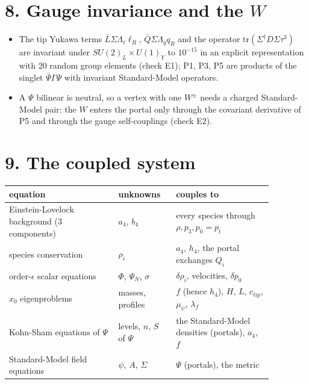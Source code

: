 \documentclass[11pt]{article}
\begin{document}
\section*{8. Gauge invariance and the $W$}

\begin{itemize}
\item The tip Yukawa terms $\bar L\Sigma\Lambda_\ell\ell_R$, $\bar Q\Sigma\Lambda_qq_R$ and the operator $\mathrm{tr}(\Sigma^\dagger D\Sigma\tau^3)$ are invariant under $SU(2)_L\times U(1)_Y$ to $10^{-15}$ in an explicit representation with 20 random group elements (check E1); P1, P3, P5 are products of the singlet $\bar\Psi\Gamma\Psi$ with invariant Standard-Model operators.
\item A $\Psi$ bilinear is neutral, so a vertex with one $W^\pm$ needs a charged Standard-Model pair: the $W$ enters the portal only through the covariant derivative of P5 and through the gauge self-couplings (check E2).
\end{itemize}

\section*{9. The coupled system}

\begin{longtable}{>{\raggedright\arraybackslash}p{0.360\linewidth}>{\raggedright\arraybackslash}p{0.180\linewidth}>{\raggedright\arraybackslash}p{0.329\linewidth}}
\toprule
\textbf{equation} & \textbf{unknowns} & \textbf{couples to} \\
\midrule
Einstein-Lovelock background (3 components) & $a_4$, $b_4$ & every species through $\rho, p_3, p_0 = p_t$ \\
species conservation & $\rho_i$ & $a_4$, $h_4$, the portal exchanges $Q_i$ \\
order-$\epsilon$ scalar equations & $\Phi$, $\Psi_N$, $\sigma$ & $\delta\rho_i$, velocities, $\delta p_{0}$ \\
$x_0$ eigenproblems & masses, profiles & $f$ (hence $h_4$), $H$, $L$, $c_{tip}$, $\mu_\psi$, $\lambda_f$ \\
Kohn-Sham equations of $\Psi$ & levels, $n$, $S$ of $\Psi$ & the Standard-Model densities (portals), $a_4$, $f$ \\
Standard-Model field equations & $\psi$, $A$, $\Sigma$ & $\Psi$ (portals), the metric \\
\bottomrule
\end{longtable}
\end{document}

